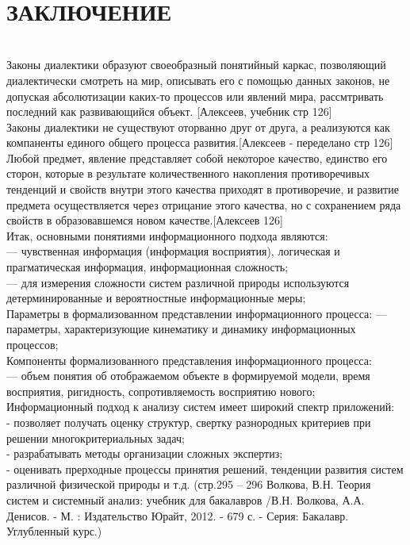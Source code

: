 \documentclass[a4paper,12pt]{report}
\begin{document}
\\

\chapter*{ЗАКЛЮЧЕНИЕ }
 \\

Законы диалектики образуют своеобразный понятийный каркас, позволяющий диалектически смотреть на мир, описывать его с помощью данных законов, не допуская абсолютизации каких-то процессов или явлений мира, рассмтривать последний как развивающийся объект. [Алексеев, учебник стр 126]\\
Законы диалектики не существуют оторванно  друг от друга, а реализуются как компаненты единого общего процесса развития.[Алексеев - переделано стр 126]\\
Любой предмет, явление представляет собой некоторое качество, единство его сторон, которые в результате количественного накопления противоречивых тенденций и свойств внутри этого качества приходят в противоречие, и развитие предмета осуществляется через отрицание этого качества, но с сохранением ряда свойств в образовавшемся новом качестве.[Алексеев 126]\\

Итак, основными понятиями информационного подхода являются: \\
— чувственная информация (информация восприятия), логическая и прагматическая информация, информационная сложность;\\
— для измерения сложности систем различной природы используются детерминированные и вероятностные информационные меры;\\

Параметры в формализованном представлении информационного процесса:
— параметры, характеризующие кинематику и динамику информационных процессов;\\

Компоненты формализованного представления информационного процесса:\\
— объем понятия об отображаемом объекте в формируемой модели, время восприятия, ригидность, сопротивляемость восприятию нового;\\

Информационный подход к анализу систем имеет широкий спектр приложений:\\
- позволяет получать оценку структур, свертку разнородных критериев при решении многокритериальных задач;\\
- разрабатывать методы организации сложных экспертиз;\\
- оценивать прерходные процессы принятия решений, тенденции развития систем различной физической природы и т.д. (стр.295 – 296  Волкова, В.Н. Теория систем и системный анализ: учебник для бакалавров /В.Н. Волкова, А.А. Денисов. - М. : Издательство Юрайт, 2012. - 679 с. - Серия: Бакалавр. Углубленный курс.)\\
\end{document}
